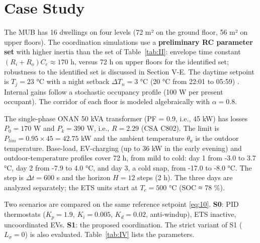 \documentclass[conference]{IEEEtran}
\begin{document}
\section{\textbf{Case Study}}

The MUB has 16 dwellings on four levels (72 m² on the ground floor, 56 m² on upper floors). The coordination simulations use a \textbf{preliminary RC parameter set} with higher inertia than the set of Table~\ref{tab:II}: envelope time constant \((R_i+R_o)C_e\approx170\) h, versus 72 h on upper floors for the identified set; robustness to the identified set is discussed in Section V-E. The daytime setpoint is \(T_j=23\) °C with a night setback \(\Delta T_n=3\) °C (20 °C from 22:01 to 05:59) \cite{RNCan2024}. Internal gains follow a stochastic occupancy profile \cite{Richardson2008} (100 W per present occupant). The corridor of each floor is modeled algebraically with \(\alpha=0.8\).

The single-phase ONAN 50 kVA transformer (PF = 0.9, i.e., 45 kW) has losses \(P_0=170\) W and \(P_k=390\) W, i.e., \(R=2.29\) (CSA C802). The limit is \(P_{lim}=0.95\times45=42.75\) kW and the ambient temperature \(\theta_a\) is the outdoor temperature. Base-load, EV-charging (up to 36 kW in the early evening) and outdoor-temperature profiles cover 72 h, from mild to cold: day 1 from -3.0 to 3.7 °C, day 2 from -7.9 to 4.0 °C, and day 3, a cold snap, from -17.0 to -8.0 °C. The step is \(\Delta t=600\) s and the horizon \(H=12\) steps (2 h). The three days are analyzed separately; the ETS units start at \(T_c=500\) °C (SOC ≈ 78 \%).

Two scenarios are compared on the same reference setpoint \eqref{eq:10}. \textbf{S0}: PID thermostats (\(K_p=1.9\), \(K_i=0.005\), \(K_d=0.02\), anti-windup), ETS inactive, uncoordinated EVs. \textbf{S1}: the proposed coordination. The strict variant of S1 (\(L_\sigma=0\)) is also evaluated. Table~\ref{tab:IV} lists the parameters.
\end{document}

